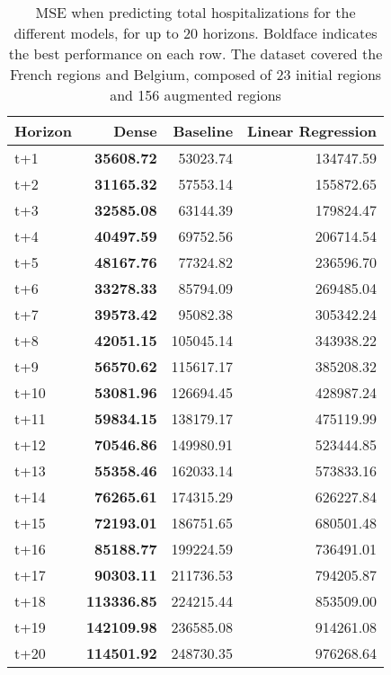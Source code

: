 \begin{table}[H]
\centering
\caption{MSE when predicting total hospitalizations for the different models, for up to 20 horizons. Boldface indicates the best performance on each row. The dataset covered the French regions and Belgium, composed of 23 initial regions and 156 augmented regions }
\label{tab:MSE_comparison}
\begin{tabular}{lrrr}
\toprule
Horizon &     Dense &  Baseline &  Linear Regression \\
\midrule
t+1  & \textbf{35608.72}  & 53023.74  & 134747.59  \\
t+2  & \textbf{31165.32}  & 57553.14  & 155872.65  \\
t+3  & \textbf{32585.08}  & 63144.39  & 179824.47  \\
t+4  & \textbf{40497.59}  & 69752.56  & 206714.54  \\
t+5  & \textbf{48167.76}  & 77324.82  & 236596.70  \\
t+6  & \textbf{33278.33}  & 85794.09  & 269485.04  \\
t+7  & \textbf{39573.42}  & 95082.38  & 305342.24  \\
t+8  & \textbf{42051.15}  & 105045.14  & 343938.22  \\
t+9  & \textbf{56570.62}  & 115617.17  & 385208.32  \\
t+10  & \textbf{53081.96}  & 126694.45  & 428987.24  \\
t+11  & \textbf{59834.15}  & 138179.17  & 475119.99  \\
t+12  & \textbf{70546.86}  & 149980.91  & 523444.85  \\
t+13  & \textbf{55358.46}  & 162033.14  & 573833.16  \\
t+14  & \textbf{76265.61}  & 174315.29  & 626227.84  \\
t+15  & \textbf{72193.01}  & 186751.65  & 680501.48  \\
t+16  & \textbf{85188.77}  & 199224.59  & 736491.01  \\
t+17  & \textbf{90303.11}  & 211736.53  & 794205.87  \\
t+18  & \textbf{113336.85}  & 224215.44  & 853509.00  \\
t+19  & \textbf{142109.98}  & 236585.08  & 914261.08  \\
t+20  & \textbf{114501.92}  & 248730.35  & 976268.64  \\

\bottomrule
\end{tabular}
\end{table}
